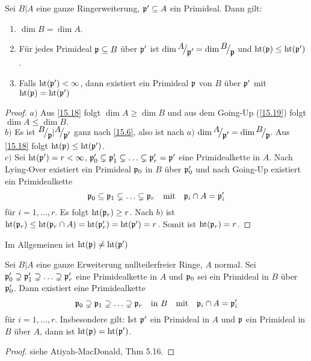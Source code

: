 \begin{sa}
	Sei $B|A$ eine ganze Ringerweiterung, $\mathfrak{p}'\subseteq A$ ein Primideal. Dann gilt:
	\begin{enumerate}[label= \alph*)]
		\item $\dim B = \dim A$.
		\item Für jedes Primideal $\mathfrak{p}\subseteq B$ über $\mathfrak{p}'$ ist $\dim \QR{A}{\p'} = \dim \QR{B}{\p}$ und $\text{ht}(\mathfrak{p}) \leq \text{ht}(\mathfrak{p}')$.
		\item Falls $\text{ht}(\mathfrak{p}')< \infty$, dann existiert ein Primideal $\mathfrak{p}$ von $B$ über $\mathfrak{p}'$ mit $\text{ht}(\mathfrak{p}) = \text{ht}(\mathfrak{p}')$
	\end{enumerate}
\end{sa}
\begin{proof}
	$a)$ Aus \ref{15.18} folgt $\dim A \geq \dim B$ und aus dem Going-Up (\ref{15.19}) folgt $\dim A \leq \dim B. $\\
	$b)$ Es ist $\QR{B}{\p} | \QR{A}{\p'}$ ganz nach \ref{15.6}, also ist nach $a)$ $\dim \QR{A}{\p'} = \dim \QR{B}{\p}$. Aus \ref{15.18} folgt $\text{ht}(\mathfrak{p}) \leq \text{ht}(\mathfrak{p}')$.\\
	$c)$ Sei $\text{ht}(\mathfrak{p}')=r < \infty$, $\mathfrak{p}_0'\subsetneq \mathfrak{p}_1' \subsetneq \ldots \subsetneq \mathfrak{p}_r' = \mathfrak{p}'$ eine Primidealkette in $A$. Nach Lying-Over existiert ein Primideal $\mathfrak{p}_0$ in $B$ über $\mathfrak{p}_0'$ und nach Going-Up existiert ein Primidealkette 
	$$\mathfrak{p}_0\subseteq \mathfrak{p}_1 \subsetneq \ldots \subsetneq \mathfrak{p}_r \quad \text{mit} \quad \mathfrak{p}_i \cap A = \mathfrak{p}_i'$$
	für $i=1, \ldots, r$. Es folgt $\text{ht}(\mathfrak{p}_r)\geq r$. Nach $b)$ ist $\text{ht}(\mathfrak{p}_r) \leq \text{ht}(\mathfrak{p}_r \cap A) =\text{ht}(\mathfrak{p}_r') = \text{ht}(\mathfrak{p}') =r$. Somit ist $\text{ht}(\mathfrak{p}_r) = r$. 
\end{proof}
\begin{anm}
	Im Allgemeinen ist $\text{ht}(\mathfrak{p}) \neq \text{ht}(\mathfrak{p}')$
\end{anm}
\begin{sa}
	Sei $B|A$ eine ganze Erweiterung nullteilerfreier Ringe, $A$ normal. Sei $\mathfrak{p}_0'\supsetneq \mathfrak{p}_1'\supsetneq \ldots \supsetneq \mathfrak{p}_r'$ eine Primidealkette in $A$ und $\mathfrak{p}_0$ sei ein Primideal in $B$ über $\mathfrak{p}_0'$. Dann existiert eine Primidealkette
	$$\mathfrak{p}_0\supsetneq \mathfrak{p}_1\supsetneq \ldots \supsetneq \mathfrak{p}_r \quad \text{in }B \quad \text{mit} \quad \mathfrak{p}_i \cap A = \mathfrak{p}_i'$$
	für $i=1, \ldots, r$. Insbesondere gilt: Ist $\mathfrak{p}'$ ein Primideal in $A$ und $\mathfrak{p}$ ein Primideal in $B$ über $A$, dann ist $\text{ht}(\mathfrak{p}) = \text{ht}(\mathfrak{p}')$.
\end{sa}
\begin{proof}
	siehe Atiyah-MacDonald, Thm 5.16.
\end{proof}